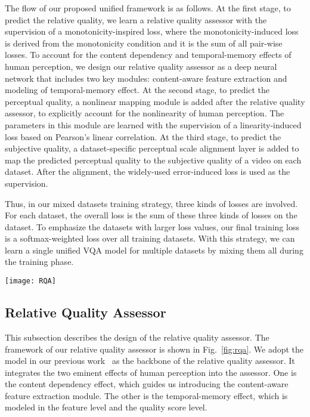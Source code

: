 \documentclass[twocolumn]{svjour3}          \smartqed  \usepackage{graphicx}
\begin{document}
The flow of our proposed unified framework is as follows. 
At the first stage, to predict the relative quality, we learn a relative quality assessor with the supervision of a monotonicity-inspired loss, where the monotonicity-induced loss is derived from the monotonicity condition and it is the sum of all pair-wise losses. 
To account for the content dependency and temporal-memory effects of human perception, we design our relative quality assessor as a deep neural network that includes two key modules: content-aware feature extraction and modeling of temporal-memory effect. 
At the second stage, to predict the perceptual quality, a nonlinear mapping module is added after the relative quality assessor, to explicitly account for the nonlinearity of human perception. 
The parameters in this module are learned with the supervision of a linearity-induced loss based on Pearson's linear correlation.
At the third stage, to predict the subjective quality, a dataset-specific perceptual scale alignment layer is added to map the predicted perceptual quality to the subjective quality of a video on each dataset. 
After the alignment, the widely-used error-induced loss is used as the supervision.

Thus, in our mixed datasets training strategy, three kinds of losses are involved.
For each dataset, the overall loss is the sum of these three kinds of losses on the dataset.
To emphasize the datasets with larger loss values, our final training loss is a softmax-weighted loss over all training datasets.
With this strategy, we can learn a single unified VQA model for multiple datasets by mixing them all during the training phase.

\begin{figure*}[!htb]
    \centering
    \texttt{[image: RQA]}
    \caption{Relative Quality Assessor. It mainly consists of two modules. Module I includes a pre-trained CNN with effective global pooling (GP) serving as a content-aware feature extractor. Module II models temporal-memory effect and it includes two sub-modules: a GRU network and a subjectively-inspired temporal pooling layer. Note that the GRU network is the unrolled version of one GRU and the parallel CNNs/FCs share weights.}
    \label{fig:rqa}
\end{figure*}
 
\subsection{Relative Quality Assessor}
This subsection describes the design of the relative quality assessor. 
The framework of our relative quality assessor is shown in Fig.~\ref{fig:rqa}. 
We adopt the model in our previous work~\citep{li2019quality} as the backbone of the relative quality assessor. 
It integrates the two eminent effects of human perception into the assessor. 
One is the content dependency effect, which guides us introducing the content-aware feature extraction module. 
The other is the temporal-memory effect, which is modeled in the feature level and the quality score level.
\end{document}
